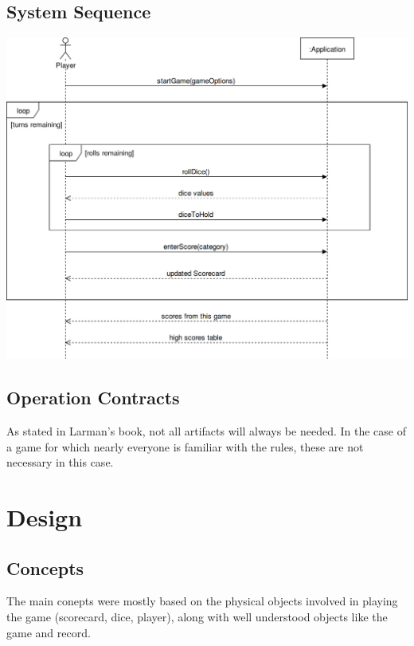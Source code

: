 \documentclass[12pt]{article}
\begin{document}
\subsection*{System Sequence}
\includegraphics[scale=.3]{diagrams/sequence.png}

\subsection*{Operation Contracts}
As stated in Larman's book, not all artifacts will always be needed.  In the case of a game for which nearly everyone is familiar with the rules, these are not necessary in this case.

\newpage
\section*{Design}
\subsection*{Concepts}
The main conepts were mostly based on the physical objects involved in playing the game (scorecard, dice, player), along with well understood objects like the game and record.  \newline \vspace{.2in}
\end{document}
